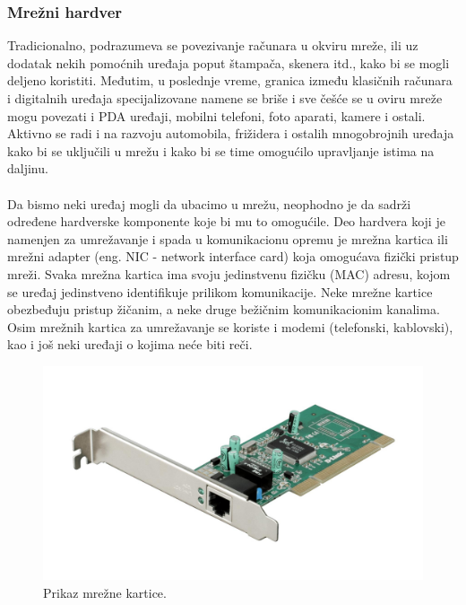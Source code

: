 \documentclass[a4paper]{article}
\begin{document}
\subsubsection{Mrežni hardver}
Tradicionalno, podrazumeva se povezivanje računara u okviru mreže, ili uz dodatak nekih pomoćnih uređaja poput štampača, skenera itd., kako bi se mogli deljeno koristiti. Međutim, u poslednje vreme, granica između klasičnih računara i digitalnih uređaja specijalizovane namene se briše i sve češće se u oviru mreže mogu povezati i PDA uređaji, mobilni telefoni, foto aparati, kamere i ostali. Aktivno se radi i na razvoju automobila, frižidera i ostalih mnogobrojnih uređaja kako bi se uključili u mrežu i kako bi se time omogućilo upravljanje istima na daljinu.\\\\
Da bismo neki uređaj mogli da ubacimo u mrežu, neophodno je da sadrži određene hardverske komponente koje bi mu to omogućile. Deo hardvera koji je namenjen za umrežavanje i spada u komunikacionu opremu je mrežna kartica ili mrežni adapter (eng. NIC - network interface card) koja omogućava fizički pristup mreži. Svaka mrežna kartica ima svoju jedinstvenu fizičku (MAC) adresu, kojom se uređaj jedinstveno identifikuje prilikom komunikacije. Neke mrežne kartice obezbeđuju pristup žičanim, a neke druge bežičnim komunikacionim kanalima. Osim mrežnih kartica za umrežavanje se koriste i modemi (telefonski, kablovski), kao i još neki uređaji o kojima neće biti reči. 
\begin{figure}[h!]
\begin{center}
\includegraphics[scale=0.25]{pictures/mreznakartica.jpg}
\end{center}
\caption{Prikaz mrežne kartice.}
\label{fig:mk}
\end{figure}
\end{document}
